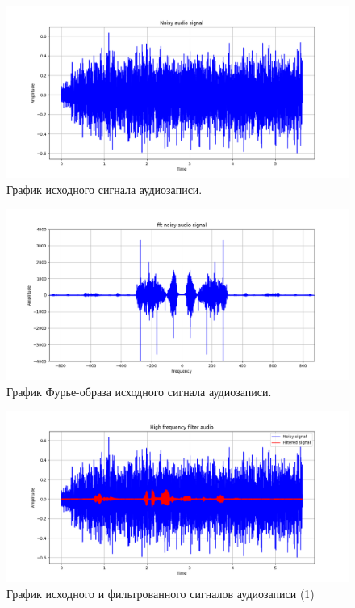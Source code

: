 \documentclass[a4paper, 12pt]{article}
\begin{document}
    \begin{figure}[!htb]
        \centering
        \includegraphics[scale=0.48]{noisy_audio.png}
        \captionsetup{skip=0pt}
        \caption{График исходного сигнала аудиозаписи.}
        \label{fig:fig111}
    \end{figure}
    \begin{figure}[!htb]
        \centering
        \includegraphics[scale=0.48]{U_audio.png}
        \captionsetup{skip=0pt}
        \caption{График Фурье-образа исходного сигнала аудиозаписи.}
        \label{fig:fig112}
    \end{figure}
    \begin{figure}[!htb]
        \centering
        \includegraphics[scale=0.48]{u_flt_u_audio.png}
        \captionsetup{skip=0pt}
        \caption{График исходного и фильтрованного сигналов аудиозаписи (1)}
        \label{fig:fig113}
    \end{figure}
\end{document}
